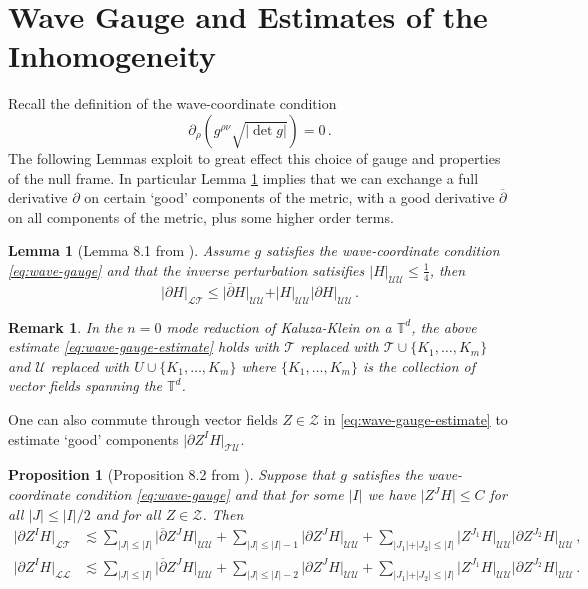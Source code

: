 \documentclass[11pt, a4paper]{amsart}
\numberwithin{equation}{section}
\newtheorem{lemma}[theorem]{Lemma}
\newtheorem{proposition}[theorem]{Proposition}
\newtheorem{remark}[theorem]{Remark}
\numberwithin{theorem}{section}
\newcommand{\p}{\partial}
\newcommand{\tee}{{\mathbb{T}^d}}
\newcommand{\pgood}{\overline{\partial}}
\newcommand{\UU}{{\mathcal{U} \mathcal{U}}}
\newcommand{\LL}{{\mathcal{L} \mathcal{L}}}
\newcommand{\TU}{{\mathcal{T} \mathcal{U}}}
\newcommand{\LT}{{\mathcal{L} \mathcal{T}}}
\newcommand{\U}{\mathcal{U}}
\newcommand{\I}{\vert I \vert}
\newcommand{\J}{\vert J \vert}
\begin{document}
\section{Wave Gauge and Estimates of the Inhomogeneity} \label{section:wave-gauge} 
Recall the definition of the wave-coordinate condition
\begin{equation}
\p_\rho \left( g^{\rho \nu} \sqrt{\vert \det g \vert} \right) = 0 \,. \label{eq:wave-gauge}
\end{equation}
The following Lemmas exploit to great effect this choice of gauge and properties of the null frame. In particular Lemma \ref{lemma-8.1} implies that we can exchange a full derivative $\p$ on certain `good' components of the metric, with a good derivative $\pgood$ on all components of the metric, plus some higher order terms. 
\begin{lemma}[Lemma 8.1 from \cite{LR:04}]  \label{lemma-8.1}
Assume $g$ satisfies the wave-coordinate condition \eqref{eq:wave-gauge} and that the inverse perturbation satisifies $\vert H \vert_\UU \leq \frac{1}{4}$,  then
\begin{equation} \vert \p H \vert_\LT \leq \vert \pgood H \vert_\UU+ \vert H \vert_\UU \vert \p H \vert_\UU \,. \label{eq:wave-gauge-estimate} \end{equation} 
\end{lemma}
\begin{remark}
In the $n=0$ mode reduction of Kaluza-Klein on a $\tee$, the above estimate \eqref{eq:wave-gauge-estimate} holds with $\mathcal{T}$ replaced with $ \mathcal{T} \cup \{ K_1, \ldots, K_m \}$ and $\U $ replaced with $ U \cup \{ K_1, \ldots, K_m \}$ where $\{ K_1, \ldots, K_m \}$ is the collection of vector fields spanning the $\tee$.
\end{remark}
One can also commute through vector fields $Z \in \mathcal{Z}$ in \eqref{eq:wave-gauge-estimate} to estimate `good' components $ \vert \p Z^I H \vert_\TU$. 
\begin{proposition}[Proposition 8.2 from \cite{LR:04}] \label{prop-8.2}
Suppose that $g$ satisfies the wave-coordinate condition \eqref{eq:wave-gauge} and that for some $\I$ we have $\vert Z^J H \vert \leq C$ for all $\vert J \vert \leq \vert I \vert / 2$ and for all $Z \in \mathcal{Z}$. Then
\begin{align*}
\vert \p Z^I H \vert_\LT & \lesssim \sum_{\J\leq \I} \vert \pgood Z^J H \vert_\UU  + \sum_{\J \leq \I-1 } \vert \p Z^J H \vert _\UU + \sum_{\vert J_1 \vert + \vert J_2 \vert \leq \I} \vert Z^{J_1} H \vert_\UU  \vert \p Z^{J_2} H \vert_\UU \,,\\
\vert \p Z^I H \vert_\LL & \lesssim \sum_{\J \leq \I} \vert \pgood Z^J H \vert_\UU  + \sum_{\J \leq \I-2 } \vert \p Z^J H \vert _\UU + \sum_{\vert J_1 \vert + \vert J_2 \vert \leq \I} \vert Z^{J_1} H \vert_\UU  \vert \p Z^{J_2} H \vert_\UU \,.
\end{align*}
\end{proposition}
\end{document}
